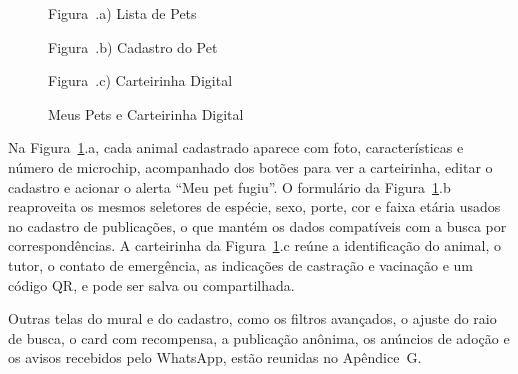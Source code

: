 \begin{figure}[H]
    \centering
    \caption{Meus Pets e Carteirinha Digital}
    \label{fig:tela_meus_pets}
    \vspace{0.15cm}
    \begin{minipage}[t]{0.31\textwidth}
        \centering
        \par\vspace{0.12cm}
        {\small Figura~\thefigure.a) Lista de Pets}
    \end{minipage}
    \hfill
    \begin{minipage}[t]{0.31\textwidth}
        \centering
        \par\vspace{0.12cm}
        {\small Figura~\thefigure.b) Cadastro do Pet}
    \end{minipage}
    \hfill
    \begin{minipage}[t]{0.31\textwidth}
        \centering
        \par\vspace{0.12cm}
        {\small Figura~\thefigure.c) Carteirinha Digital}
    \end{minipage}
    \par\vspace{0.12cm}
\end{figure}

Na Figura~\ref{fig:tela_meus_pets}.a, cada animal cadastrado aparece com foto, características e número de microchip, acompanhado dos botões para ver a carteirinha, editar o cadastro e acionar o alerta ``Meu pet fugiu''. O formulário da Figura~\ref{fig:tela_meus_pets}.b reaproveita os mesmos seletores de espécie, sexo, porte, cor e faixa etária usados no cadastro de publicações, o que mantém os dados compatíveis com a busca por correspondências. A carteirinha da Figura~\ref{fig:tela_meus_pets}.c reúne a identificação do animal, o tutor, o contato de emergência, as indicações de castração e vacinação e um código QR, e pode ser salva ou compartilhada.

Outras telas do mural e do cadastro, como os filtros avançados, o ajuste do raio de busca, o card com recompensa, a publicação anônima, os anúncios de adoção e os avisos recebidos pelo WhatsApp, estão reunidas no Apêndice~G.
